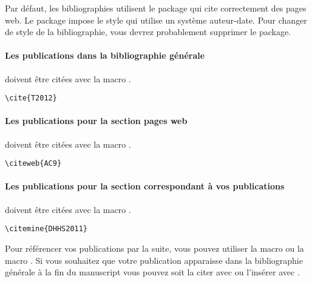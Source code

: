 Par défaut, les bibliographies utilisent le package qui cite correctement des pages web.
Le package impose le style  qui utilise un système auteur-date.
Pour changer de style de la bibliographie, vous devrez probablement supprimer le package.

\paragraph{Les publications dans la bibliographie générale} doivent être citées avec la macro .

\begin{framed}
\noindent\cite{T2012}\vspace{-0.75em}
\begin{verbatim}\cite{T2012}\end{verbatim}\vspace{-0.75em}
\end{framed}

\paragraph{Les publications pour la section pages web} doivent être citées avec la macro .

\begin{framed}
\noindent{} \vspace{-0.75em}
\begin{verbatim}\citeweb{AC9}\end{verbatim}\vspace{-0.75em}
\end{framed}

\paragraph{Les publications pour la section correspondant à vos publications} doivent être citées avec la macro .

\begin{framed}
\noindent{} \vspace{-0.75em}
\begin{verbatim}\citemine{DHHS2011}\end{verbatim}\vspace{-0.75em}
\end{framed}

Pour référencer vos publications par la suite, vous pouvez utiliser la macro  ou la macro .
Si vous souhaitez que votre publication apparaisse dans la bibliographie générale à la fin du manuscript vous pouvez soit la citer avec  ou l'insérer avec . \nocite{DHHS2011}

